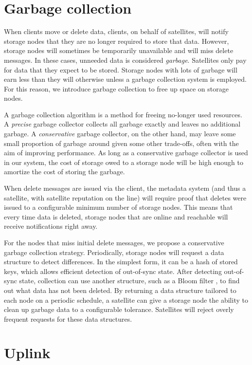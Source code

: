 \documentclass[11pt,fleqn,openany]{book}
\begin{document}
\section{Garbage collection}\label{sec:garbage-collection}

When clients move or delete data, clients, on behalf of satellites, will notify
storage nodes
that they are no longer required to store that data. However,
storage nodes will sometimes be temporarily unavailable and will miss delete
messages. In these cases, unneeded data is considered
{\em garbage}. Satellites only pay for data that they expect to be stored. Storage
nodes with lots of garbage will earn less than they will
otherwise unless a garbage collection system is employed. For this reason, we
introduce garbage collection to free up space on storage nodes.

A garbage collection algorithm is a method for freeing no-longer used resources.
A {\em precise} garbage collector collects all garbage exactly and
leaves no additional garbage. A {\em conservative} garbage collector, on the
other hand, may
leave some small proportion of garbage around given some other trade-offs,
often with the aim of improving performance.
As long as a conservative garbage collector is used in our system, the cost of
storage owed to a storage node will be high enough to amortize the cost of
storing the garbage.

When delete messages are issued via the client, the metadata system (and thus a
satellite, with satellite reputation on the line) will require proof that
deletes were issued to a configurable minimum number of storage nodes.
This means that every time
data is deleted, storage nodes that are online and reachable will receive
notifications right away.

For the nodes that miss initial delete messages, we propose a conservative
garbage collection strategy. Periodically, storage nodes will request
a data structure to detect differences. In the simplest form, it can be a hash
of stored keys, which allows efficient detection of out-of-sync state. After
detecting out-of-sync state, collection can use another structure, such as a
Bloom filter \cite{bloom-filter}, to find out what data has not been
deleted.
By returning a data
structure tailored to each node on a periodic schedule, a satellite can give a
storage node the ability to clean up garbage data to a configurable tolerance.
Satellites will reject overly frequent requests for these data structures.

\section{Uplink}
\end{document}
